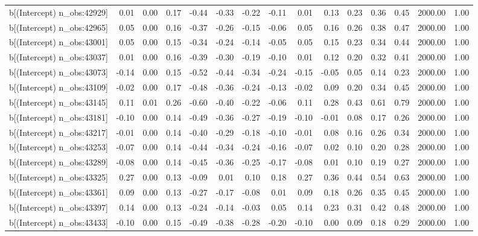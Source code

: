 \begin{table}[ht]
\begin{tabular}{rrrrrrrrrrrrrrr}
  b[(Intercept) n\_obs:42929] & 0.01 & 0.00 & 0.17 & -0.44 & -0.33 & -0.22 & -0.11 & 0.01 & 0.13 & 0.23 & 0.36 & 0.45 & 2000.00 & 1.00 \\ 
  b[(Intercept) n\_obs:42965] & 0.05 & 0.00 & 0.16 & -0.37 & -0.26 & -0.15 & -0.06 & 0.05 & 0.16 & 0.26 & 0.38 & 0.47 & 2000.00 & 1.00 \\ 
  b[(Intercept) n\_obs:43001] & 0.05 & 0.00 & 0.15 & -0.34 & -0.24 & -0.14 & -0.05 & 0.05 & 0.15 & 0.23 & 0.34 & 0.44 & 2000.00 & 1.00 \\ 
  b[(Intercept) n\_obs:43037] & 0.01 & 0.00 & 0.16 & -0.39 & -0.30 & -0.19 & -0.10 & 0.01 & 0.12 & 0.20 & 0.32 & 0.41 & 2000.00 & 1.00 \\ 
  b[(Intercept) n\_obs:43073] & -0.14 & 0.00 & 0.15 & -0.52 & -0.44 & -0.34 & -0.24 & -0.15 & -0.05 & 0.05 & 0.14 & 0.23 & 2000.00 & 1.00 \\ 
  b[(Intercept) n\_obs:43109] & -0.02 & 0.00 & 0.17 & -0.48 & -0.36 & -0.24 & -0.13 & -0.02 & 0.09 & 0.20 & 0.34 & 0.45 & 2000.00 & 1.00 \\ 
  b[(Intercept) n\_obs:43145] & 0.11 & 0.01 & 0.26 & -0.60 & -0.40 & -0.22 & -0.06 & 0.11 & 0.28 & 0.43 & 0.61 & 0.79 & 2000.00 & 1.00 \\ 
  b[(Intercept) n\_obs:43181] & -0.10 & 0.00 & 0.14 & -0.49 & -0.36 & -0.27 & -0.19 & -0.10 & -0.01 & 0.08 & 0.17 & 0.26 & 2000.00 & 1.00 \\ 
  b[(Intercept) n\_obs:43217] & -0.01 & 0.00 & 0.14 & -0.40 & -0.29 & -0.18 & -0.10 & -0.01 & 0.08 & 0.16 & 0.26 & 0.34 & 2000.00 & 1.00 \\ 
  b[(Intercept) n\_obs:43253] & -0.07 & 0.00 & 0.14 & -0.44 & -0.34 & -0.24 & -0.16 & -0.07 & 0.02 & 0.10 & 0.20 & 0.28 & 2000.00 & 1.00 \\ 
  b[(Intercept) n\_obs:43289] & -0.08 & 0.00 & 0.14 & -0.45 & -0.36 & -0.25 & -0.17 & -0.08 & 0.01 & 0.10 & 0.19 & 0.27 & 2000.00 & 1.00 \\ 
  b[(Intercept) n\_obs:43325] & 0.27 & 0.00 & 0.13 & -0.09 & 0.01 & 0.10 & 0.18 & 0.27 & 0.36 & 0.44 & 0.54 & 0.63 & 2000.00 & 1.00 \\ 
  b[(Intercept) n\_obs:43361] & 0.09 & 0.00 & 0.13 & -0.27 & -0.17 & -0.08 & 0.01 & 0.09 & 0.18 & 0.26 & 0.35 & 0.45 & 2000.00 & 1.00 \\ 
  b[(Intercept) n\_obs:43397] & 0.14 & 0.00 & 0.13 & -0.24 & -0.14 & -0.03 & 0.05 & 0.14 & 0.23 & 0.31 & 0.42 & 0.48 & 2000.00 & 1.00 \\ 
  b[(Intercept) n\_obs:43433] & -0.10 & 0.00 & 0.15 & -0.49 & -0.38 & -0.28 & -0.20 & -0.10 & 0.00 & 0.09 & 0.18 & 0.29 & 2000.00 & 1.00 \\ 

\end{tabular}
\end{table}
